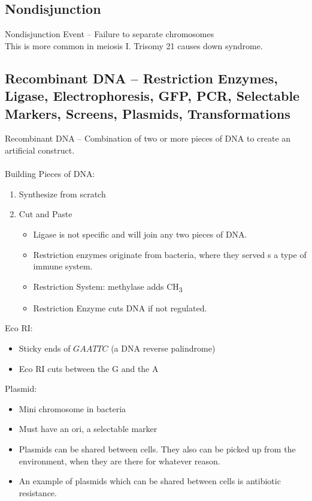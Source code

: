 \documentclass{article}
\begin{document}
\subsection{Nondisjunction}

Nondisjunction Event -- Failure to separate chromosomes\\
This is more common in meiosis I. Trisomy 21 causes down syndrome.

\subsection{Recombinant DNA -- Restriction Enzymes, Ligase, Electrophoresis, GFP, PCR, Selectable Markers, Screens, Plasmids, Transformations}
Recombinant DNA -- Combination of two or more pieces of DNA to create an artificial construct.\\
\\
Building Pieces of DNA:
\begin{enumerate}
\item Synthesize from scratch
\item Cut and Paste
\begin{itemize}
\item Ligase is not specific and will join any two pieces of DNA.
\item Restriction enzymes originate from bacteria, where they served s a type of immune system.
\item Restriction System: methylase adds CH\textsubscript{3}
\item Restriction Enzyme cuts DNA if not regulated.
\end{itemize}
\end{enumerate}

Eco RI:
\begin{itemize}
\item Sticky ends of $GAATTC$ (a DNA reverse palindrome)
\item Eco RI cuts between the G and the A
\end{itemize}

Plasmid:
\begin{itemize}
\item Mini chromosome in bacteria
\item Must have an ori, a selectable marker
\item Plasmids can be shared between cells. They also can be picked up from the
environment, when they are there for whatever reason.
\item An example of plasmids which can be shared between cells is antibiotic resistance.
\end{itemize}
\end{document}
